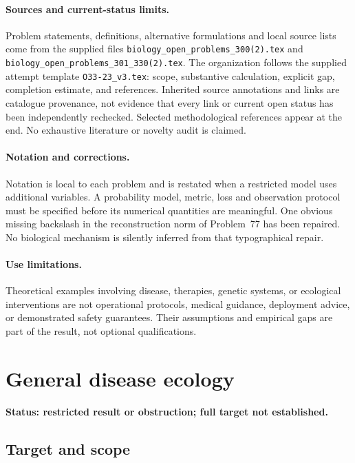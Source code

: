 \documentclass[11pt]{article}
\begin{document}
\paragraph{Sources and current-status limits.}
Problem statements, definitions, alternative formulations and local source lists
come from the supplied files
\texttt{biology\_open\_problems\_300(2).tex} and
\texttt{biology\_open\_problems\_301\_330(2).tex}.
The organization follows the supplied attempt template
\texttt{O33-23\_v3.tex}: scope, substantive calculation, explicit gap,
completion estimate, and references. Inherited source annotations and links are
catalogue provenance, not evidence that every link or current open status has
been independently rechecked. Selected methodological references appear at the
end. No exhaustive literature or novelty audit is claimed.

\paragraph{Notation and corrections.}
Notation is local to each problem and is restated when a restricted model uses
additional variables. A probability model, metric, loss and observation protocol
must be specified before its numerical quantities are meaningful. One obvious
missing backslash in the reconstruction norm of Problem~77 has been repaired.
No biological mechanism is silently inferred from that typographical repair.

\paragraph{Use limitations.}
Theoretical examples involving disease, therapies, genetic systems, or ecological
interventions are not operational protocols, medical guidance, deployment advice,
or demonstrated safety guarantees. Their assumptions and empirical gaps are part
of the result, not optional qualifications.


\section*{General disease ecology}
\label{prob:200}
\noindent\textbf{Status: restricted result or obstruction; full target not established.}
\subsection{Target and scope}
\end{document}
